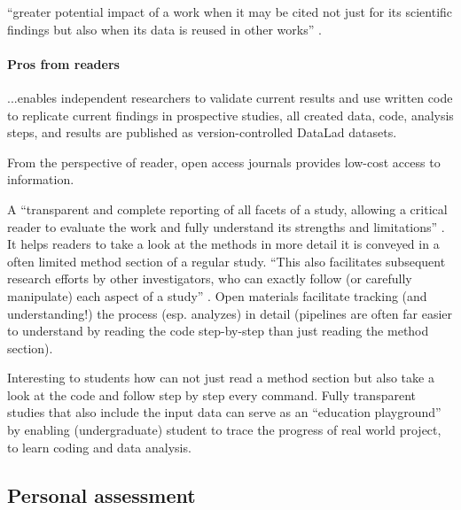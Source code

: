 
``greater potential impact of a work when it may be cited not just for its
scientific findings but also when its data is reused in other works''
\citep{nichols2017best}.


\paragraph{Pros from readers}


...enables independent researchers to validate current results and use written
code to replicate current findings in prospective studies, all created data,
code, analysis steps, and results are published as version-controlled DataLad
\citep[\href{www.datalad.org}{datalad.org};][]{halchenko2021datalad} datasets.

%
From the perspective of reader, open access journals provides low-cost access to
information.

A ``transparent and complete reporting of all facets of a study, allowing a
critical reader to evaluate the work and fully understand its strengths and
limitations'' \citep{nichols2017best}.
%
It helps readers to take a look at the methods in more detail it is conveyed in
a often limited method section of a regular study.
%
``This also facilitates subsequent research efforts by other investigators, who
can exactly follow (or carefully manipulate) each aspect of a study''
\citep{nichols2017best}.
%
Open materials facilitate tracking (and understanding!) the process (esp.
analyzes) in detail (pipelines are often far easier to understand by reading the
code step-by-step than just reading the method section).

%
Interesting to students how can not just read a method section but also take a
look at the code and follow step by step every command.
%
Fully transparent studies that also include the input data can serve as an
``education playground'' by enabling (undergraduate) student to trace the
progress of real world project, to learn coding and data analysis.



\subsection{Personal assessment}

